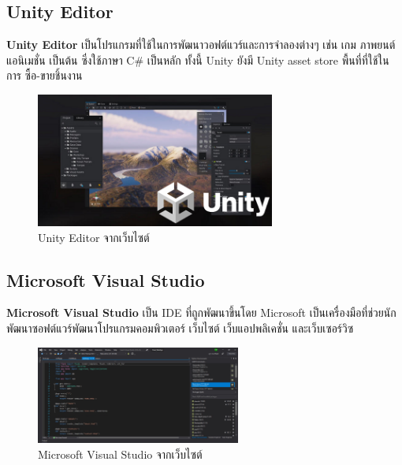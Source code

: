 \subsection{Unity Editor}
\subsubitem \textbf{Unity Editor} \cite{unity:program} เป็นโปรแกรมที่ใช้ในการพัฒนาวอฟต์แวร์และการจำลองต่างๆ เช่น เกม ภาพยนต์ แอนิเมชั่น เป็นต้น ซึ่งใช้ภาษา C$\#$ เป็นหลัก ทั้งนี้ Unity ยังมี Unity asset store พื้นที่ที่ใช้ในการ ซื้อ-ขายชิ้นงาน
\begin{figure}[h]
  \centering
  \includegraphics[width=0.7\textwidth, height=0.2\textheight]{Images/unity-engine-landscape-swimlane.png}
  \caption{Unity Editor จากเว็บไซต์}\label{Unity}
\end{figure}

\subsection{Microsoft Visual Studio}
\subsubitem \textbf{Microsoft Visual Studio} \cite{microsoft-visual-studios:program} เป็น IDE ที่ถูกพัฒนาขึ้นโดย Microsoft เป็นเครื่องมือที่ช่วยนักพัฒนาซอฟต์แวร์พัฒนาโปรแกรมคอมพิวเตอร์ เว็บไซต์ เว็บแอปพลิเคชั่น และเว็บเซอร์วิซ
\begin{figure}[h]
  \centering
  \includegraphics[width=0.6\textwidth, height=0.2\textheight]{Images/python-development-cropped.jpg}
  \caption{Microsoft Visual Studio จากเว็บไซต์}\label{Microsoft}
\end{figure}

